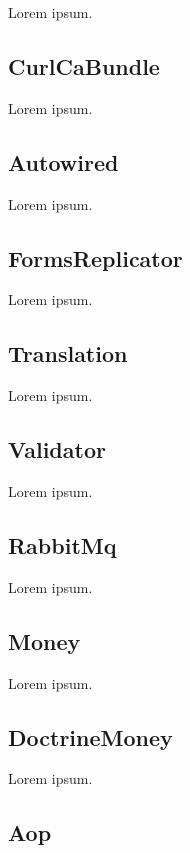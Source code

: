 Lorem ipsum.

\tocless\subsection{CurlCaBundle} \label{sec:state:curl-ca-bundle}

Lorem ipsum.

\tocless\subsection{Autowired} \label{sec:state:autowired}

Lorem ipsum.

\tocless\subsection{FormsReplicator} \label{sec:state:forms-replicator}

Lorem ipsum.

\tocless\subsection{Translation} \label{sec:state:translation}

Lorem ipsum.

\tocless\subsection{Validator} \label{sec:state:validator}

Lorem ipsum.

\tocless\subsection{RabbitMq} \label{sec:state:rabbit-mq}

Lorem ipsum.

\tocless\subsection{Money} \label{sec:state:money}

Lorem ipsum.

\tocless\subsection{DoctrineMoney} \label{sec:state:doctrine-money}

Lorem ipsum.

\tocless\subsection{Aop} \label{sec:state:aop}

